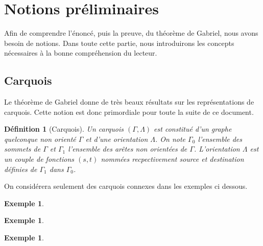 \documentclass[a4paper,10pt]{article}
\newtheorem{defi}[]{Définition}[section]
\newtheorem{ex}[]{Exemple}[section]
\begin{document}
\section{Notions préliminaires}
Afin de comprendre l'énoncé, puis la preuve, du théorème de Gabriel, nous avons besoin de notions. Dans toute cette partie, nous introduirons les concepts nécessaires à la bonne compréhension du lecteur.

\subsection{Carquois}
Le théorème de Gabriel donne de très beaux résultats sur les représentations de carquois. Cette notion est donc primordiale pour toute la suite de ce document.
\begin{defi}[Carquois]
	\label{carquois}
	Un carquois $(\Gamma,\Lambda)$ est constitué d'un graphe quelconque non orienté $\Gamma$ et d'une orientation $\Lambda$. On note  $\Gamma_0$ l'ensemble des sommets de $\Gamma$ et $\Gamma_1$ l'ensemble des arêtes non orientées de $\Gamma$. L'orientation $\Lambda$ est un couple de fonctions $(s,t)$ nommées recpectivement source et destination définies de $\Gamma_1$ dans $\Gamma_0$. 
\end{defi}
On considérera seulement des carquois connexes dans les exemples ci dessous.
	\begin{ex}
	\end{ex}
	\begin{ex}
	\end{ex}
	\begin{ex}
	\end{ex}
\end{document}
